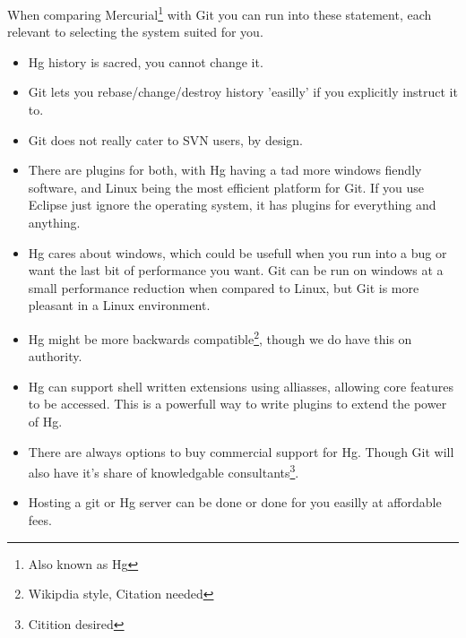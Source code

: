 When comparing Mercurial\footnote{Also known as Hg} with Git you can run into these statement, each relevant to selecting the system suited for you.
\begin{itemize}
\item
Hg history is sacred, you cannot change it.

\item
Git lets you rebase/change/destroy history 'easilly' if you explicitly instruct it to.

\item
Git does not really cater to SVN users, by design.

\item
There are plugins for both, with Hg having a tad more windows fiendly software, and Linux being the most efficient platform for Git.
If you use Eclipse just ignore the operating system, it has plugins for everything and anything.

\item
Hg cares about windows, which could be usefull when you run into a bug or want the last bit of performance you want.
Git can be run on windows at a small performance reduction when compared to Linux, but Git is more pleasant in a Linux environment.

\item
Hg might be more backwards compatible\footnote{Wikipdia style, Citation needed}, though we do have this on authority.

\item
Hg can support shell written extensions using alliasses, allowing core features to be accessed. This is a powerfull way to write plugins to extend the power of Hg.

\item
There are always options to buy commercial support for Hg.
Though Git will also have it's share of knowledgable consultants\footnote{Citition desired}.

\item
Hosting a git or Hg server can be done or done for you easilly at affordable fees.

\end{itemize}


